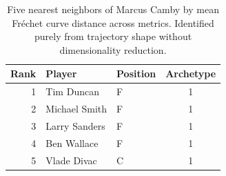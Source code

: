 \begin{table}[htbp]
  \centering\small
  \begin{tabular}{rllc}
    \toprule
    Rank & Player & Position & Archetype \\
    \midrule
    1 & Tim Duncan & F & 1 \\
    2 & Michael Smith & F & 1 \\
    3 & Larry Sanders & F & 1 \\
    4 & Ben Wallace & F & 1 \\
    5 & Vlade Divac & C & 1 \\
    \bottomrule
  \end{tabular}
  \caption{Five nearest neighbors of Marcus Camby by mean Fr\'{e}chet curve distance across metrics. Identified purely from trajectory shape without dimensionality reduction.}
  \label{tab:Marcus_Camby_frechet_curve_neighbors}
\end{table}


